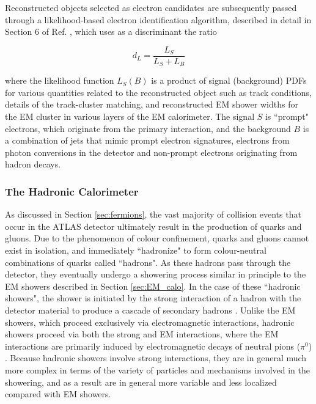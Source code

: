 Reconstructed objects selected as electron candidates are subsequently passed through a likelihood-based electron identification algorithm, described in detail in Section 6 of Ref. \cite{electron_reco}, which uses as a discriminant the ratio 

\begin{equation}
\label{eq:electron_likelihood_id_discriminant}
d_L = \frac{L_S}{L_S+L_B}
\end{equation}

\noindent where the likelihood function \(L_S(B)\) is a product of signal (background) PDFs for various quantities related to the reconstructed object such as track conditions, details of the track-cluster matching, and reconstructed EM shower widths for the EM cluster in various layers of the EM calorimeter. The signal \(S\) is ``prompt" electrons, which originate from the primary interaction, and the background \(B\) is a combination of jets that mimic prompt electron signatures, electrons from photon conversions in the detector and non-prompt electrons originating from hadron decays.

\subsubsection{The Hadronic Calorimeter}
\label{sec:had_calo}

As discussed in Section \ref{sec:fermions}, the vast majority of collision events that occur in the ATLAS detector ultimately result in the production of quarks and gluons. Due to the phenomenon of colour confinement, quarks and gluons cannot exist in isolation, and immediately ``hadronize" to form colour-neutral combinations of quarks called ``hadrons". As these hadrons pass through the detector, they eventually undergo a showering process similar in principle to the EM showers described in Section \ref{sec:EM_calo}. In the case of these ``hadronic showers", the shower is initiated by the strong interaction of a hadron with the detector material to produce a cascade of secondary hadrons \cite{shower_theory}. Unlike the EM showers, which proceed exclusively via electromagnetic interactions, hadronic showers proceed via both the strong and EM interactions, where the EM interactions are primarily induced by electromagnetic decays of neutral pions (\(\pi^0\)) \cite{shower_theory}. Because hadronic showers involve strong interactions, they are in general much more complex in terms of the variety of particles and mechanisms involved in the showering, and as a result are in general more variable and less localized compared with EM showers.

